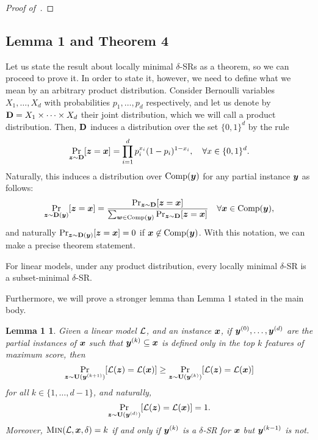 \begin{proof}[Proof of~]
\end{proof}




\subsection{Lemma 1 and Theorem 4}
Let us state the result about locally minimal $\delta$-SRs as a theorem, so we can proceed to prove it. 
In order to state it, however, we need to define what we mean by an arbitrary product distribution. Consider Bernoulli variables $X_1, \ldots, X_d$ with probabilities $p_1, \ldots, p_d$ respectively, and let us denote by $\mathbf{D} = X_1 \times \cdots \times X_d$ their joint distribution, which we will call a product distribution. Then, $\mathbf{D}$ induces a distribution over the set $\{0, 1\}^d$ by the rule
\[ 
    \Pr_{{\bm{z}} \sim \mathbf{D}}[{\bm{z}} = {\bm{x}}] = \prod_{i=1}^d p_i^{x_i} (1-p_i)^{1-x_i}, \quad \forall x \in \{0, 1\}^d.
\]
Naturally, this induces a distribution over $\operatorname{Comp}({\bm{y}})$ for any partial instance ${\bm{y}}$ as follows:
\[ 
    \Pr_{{\bm{z}} \sim \mathbf{D}({\bm{y}})}[{\bm{z}} = {\bm{x}}] =
        \frac{\Pr_{{\bm{z}} \sim \mathbf{D}}[{\bm{z}} = {\bm{x}}]}{\sum_{{\bm{w}} \in \operatorname{Comp}({\bm{y}})} \Pr_{{\bm{z}} \sim \mathbf{D}}[{\bm{z}} = {\bm{x}}]} \quad \forall {\bm{x}} \in \operatorname{Comp}({\bm{y}}),
\]
and naturally $\Pr_{{\bm{z}} \sim \mathbf{D}({\bm{y}})}[{\bm{z}} = {\bm{x}}] = 0$ if ${\bm{x}} \not\in \operatorname{Comp}({\bm{y}})$.
With this notation, we can make a precise theorem statement.
\begin{theorem}
    For linear models, under any product distribution, every locally minimal $\delta$-SR is a subset-minimal $\delta$-SR.
\end{theorem}

Furthermore, we will prove a stronger lemma than Lemma 1 stated in the main body.

\newtheorem*{theorem8}{Lemma 1}
\begin{theorem8} %
    Given a linear model $\mathcal{L}$, and an instance ${\bm{x}}$, if ${\bm{y}}^{(0)}, \ldots, {\bm{y}}^{(d)}$ are the partial instances of ${\bm{x}}$ such that ${\bm{y}}^{(k)} \subseteq {\bm{x}}$ is defined only in the top $k$ features of maximum score, then
    \[ 
        \Pr_{{\bm{z}} \sim \mathbf{U}({\bm{y}}^{(k+1)})}[\mathcal{L}({\bm{z}}) = \mathcal{L}({\bm{x}})] \geq \Pr_{{\bm{z}} \sim \mathbf{U}({\bm{y}}^{(k)})}[\mathcal{L}({\bm{z}}) = \mathcal{L}({\bm{x}})]
    \]
    for all $k \in \{1, \ldots, d-1\}$, and naturally, 
    \[ 
    \Pr_{{\bm{z}} \sim \mathbf{U}({\bm{y}}^{(d)})}[\mathcal{L}({\bm{z}}) = \mathcal{L}({\bm{x}})] = 1.
    \]
    Moreover, $\operatorname{\textnormal{\textsc{Min}}}(\mathcal{L}, {\bm{x}}, \delta) = k$ if and only if ${\bm{y}}^{(k)}$ is a $\delta$-SR for ${\bm{x}}$ but ${\bm{y}}^{(k-1)}$ is not. 
 \end{theorem8}


